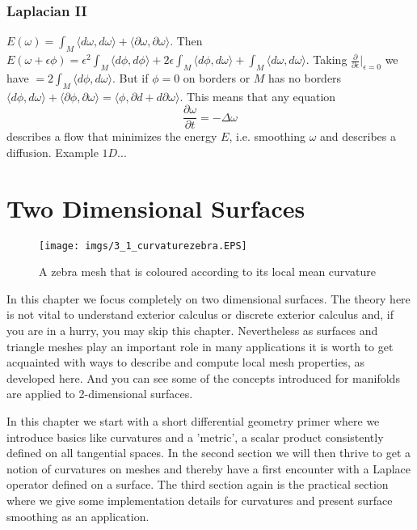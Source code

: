\newpage

\subsection{Laplacian II}
$E(\omega) = \int_M \langle d\omega, d\omega \rangle + \langle \partial\omega, \partial\omega \rangle$. Then $E(\omega + \epsilon\phi) = \epsilon^2\int_M \langle d\phi, d\phi \rangle + 2\epsilon\int_M \langle d\phi, d\omega \rangle + \int_M \langle d\omega, d\omega \rangle$. Taking $\frac{\partial}{\partial \epsilon} |_{\epsilon = 0}$ we have $=2\int_M \langle d\phi, d\omega \rangle$. But if $\phi = 0$ on borders or $M$ has no borders $\langle d\phi, d\omega \rangle + \langle \partial\phi, \partial\omega \rangle= \langle \phi, \partial d + d \partial\omega \rangle$. This means that any equation 
\[\frac{\partial \omega}{ \partial t} = - \Delta \omega \]
describes a flow that minimizes the energy $E$, i.e. smoothing $\omega$ and describes a diffusion. Example $1D$...
	

\chapter{Two Dimensional Surfaces}

\begin{figure}[h]
\begin{center}
\texttt{[image: imgs/3\_1\_curvaturezebra.EPS]}
\end{center}
\caption{A zebra mesh that is coloured according to its local mean curvature}
\end{figure}

In this chapter we focus completely on two dimensional surfaces. The theory here is not vital to understand exterior calculus or discrete exterior calculus and, if you are in a hurry, you may skip this chapter. Nevertheless as surfaces and triangle meshes play an important role in many applications it is worth to get acquainted with ways to describe and compute local mesh properties, as developed here. And you can see some of the concepts introduced for manifolds are applied to 2-dimensional surfaces.

In this chapter we start with a short differential geometry primer where we introduce basics like curvatures and a 'metric', a scalar product consistently defined on all tangential spaces. In the second section we will then thrive to get a notion of curvatures on meshes and thereby have a first encounter with a Laplace operator defined on a surface. The third section again is the practical section where we give some implementation details for curvatures and present surface smoothing as an application.

